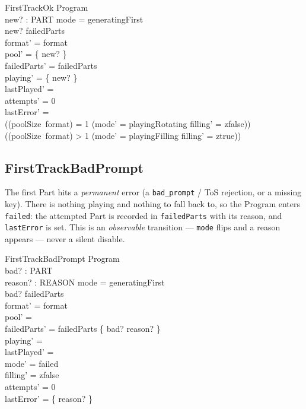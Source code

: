 \documentclass[a4paper,10pt,fleqn]{article}
\begin{document}
\begin{schema}{FirstTrackOk}
  \Delta Program \\
  new? : PART
  \where
  mode = generatingFirst \\
  new? \notin \dom failedParts \\
  format' = format \\
  pool' = \{ new? \} \\
  failedParts' = failedParts \\
  playing' = \{ new? \} \\
  lastPlayed' = \emptyset \\
  attempts' = 0 \\
  lastError' = \emptyset \\
  ((poolSize~format) = 1 \implies (mode' = playingRotating \land filling' = zfalse)) \\
  ((poolSize~format) > 1 \implies (mode' = playingFilling \land filling' = ztrue))
\end{schema}

\subsection{FirstTrackBadPrompt}

The first Part hits a \emph{permanent} error (a \texttt{bad\_prompt} / ToS
rejection, or a missing key). There is nothing playing and nothing to fall back
to, so the Program enters \texttt{failed}: the attempted Part is recorded in
\texttt{failedParts} with its reason, and \texttt{lastError} is set. This is an
\emph{observable} transition --- \texttt{mode} flips and a reason appears ---
never a silent disable.

\begin{schema}{FirstTrackBadPrompt}
  \Delta Program \\
  bad? : PART \\
  reason? : REASON
  \where
  mode = generatingFirst \\
  bad? \notin \dom failedParts \\
  format' = format \\
  pool' = \emptyset \\
  failedParts' = failedParts \oplus \{ bad? \mapsto reason? \} \\
  playing' = \emptyset \\
  lastPlayed' = \emptyset \\
  mode' = failed \\
  filling' = zfalse \\
  attempts' = 0 \\
  lastError' = \{ reason? \}
\end{schema}
\end{document}

